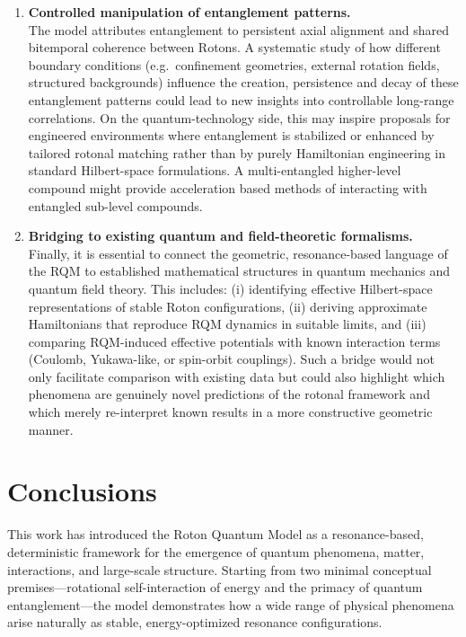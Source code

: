 \documentclass[11pt,a4paper]{article}
\begin{document}
\begin{enumerate}
    \item \textbf{Controlled manipulation of entanglement patterns.}\\
    The model attributes entanglement to persistent axial alignment and shared bitemporal coherence between Rotons.
    A systematic study of how different boundary conditions (e.g.\ confinement geometries, external rotation fields, structured backgrounds) influence the creation, persistence and decay of these entanglement patterns could lead to new insights into controllable long-range correlations.
    On the quantum-technology side, this may inspire proposals for engineered environments where entanglement is stabilized or enhanced by tailored rotonal matching rather than by purely Hamiltonian engineering in standard Hilbert-space formulations. A multi-entangled higher-level compound might provide acceleration based methods of interacting with entangled sub-level compounds. 

    \item \textbf{Bridging to existing quantum and field-theoretic formalisms.}\\
    Finally, it is essential to connect the geometric, resonance-based language of the RQM to established mathematical structures in quantum mechanics and quantum field theory.
    This includes: (i) identifying effective Hilbert-space representations of stable Roton configurations, (ii) deriving approximate Hamiltonians that reproduce RQM dynamics in suitable limits, and (iii) comparing RQM-induced effective potentials with known interaction terms (Coulomb, Yukawa-like, or spin-orbit couplings).
    Such a bridge would not only facilitate comparison with existing data but could also highlight which phenomena are genuinely novel predictions of the rotonal framework and which merely re-interpret known results in a more constructive geometric manner.
\end{enumerate}




\section{Conclusions}

This work has introduced the Roton Quantum Model as a resonance-based, deterministic framework for the emergence of quantum phenomena, matter, interactions, and large-scale structure. Starting from two minimal conceptual premises—rotational self-interaction of energy and the primacy of quantum entanglement—the model demonstrates how a wide range of physical phenomena arise naturally as stable, energy-optimized resonance configurations.
\end{document}
